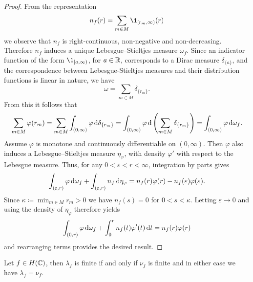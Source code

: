 \begin{proof}
    From the representation
    $$ n_f(r) = \sum_{m \in M} \1_{[r_m, \infty)}(r) $$
    we observe that $n_f$ is right-continuous, non-negative and non-decreasing. Therefore $n_f$ induces a unique Lebesgue--Stieltjes measure $\omega_f$. Since an indicator function of the form $\1_{[a, \infty)}$, for $a \in \mathbb{R}$, corresponds to a Dirac measure $\delta_{\{ a \}}$, and the correspondence between Lebesgue-Stieltjes measures and their distribution functions is linear in nature, we have
    $$ \omega = \sum_{m \in M} \delta_{\{r_m\}}. $$
    From this it follows that
    \begin{equation*}
        \sum_{m \in M} \varphi(r_m) = \sum_{m \in M} \int_{(0, \infty)} \varphi \mathop{}\!\mathrm{d} \delta_{\{r_m\}} = \int_{(0, \infty)} \varphi \mathop{}\!\mathrm{d} \left( \sum_{m \in M} \delta_{\{r_m\}} \right) = \int_{(0, \infty)} \varphi \mathop{}\!\mathrm{d} \omega_f.
    \end{equation*}
    Assume $\varphi$ is monotone and continuously differentiable on $(0, \infty)$. Then $\varphi$ also induces a Lebesgue--Stieltjes measure $\eta_\varphi$, with density $\varphi'$ with respect to the Lebesgue measure. Thus, for any $0 < \varepsilon < r < \infty$, integration by parts gives
    \begin{equation*}
        \int_{(\varepsilon, r)} \varphi \mathop{}\!\mathrm{d} \omega_f + \int_{(\varepsilon, r)} n_f \mathop{}\!\mathrm{d} \eta_\varphi = n_f(r) \varphi(r) - n_f(\varepsilon) \varphi(\varepsilon).
    \end{equation*}
    Since $\kappa \coloneqq \min_{m \in M} r_m > 0$ we have $n_f(s) = 0$ for $0 < s < \kappa$. Letting $\varepsilon \to 0$ and using the density of $\eta_\varphi$ therefore yields
    \begin{equation*}
        \int_{(0, r)} \varphi \mathop{}\!\mathrm{d} \omega_f + \int_0^r n_f(t) \varphi'(t) \mathop{}\!\mathrm{d} t = n_f(r) \varphi(r)
    \end{equation*}
    and rearranging terms provides the desired result.
\end{proof}

\begin{proposition} \label{prop:zeros-order-equals-zeros-exponent}
    Let $f \in H(\mathbb{C})$, then $\lambda_f$ is finite if and only if $\nu_f$ is finite and in either case we have $\lambda_f = \nu_f$.
\end{proposition}

